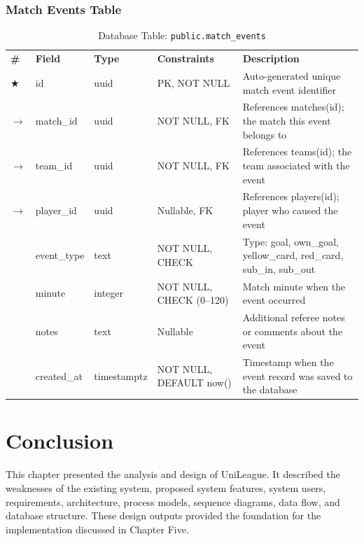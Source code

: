 \documentclass[12pt,a4paper]{report}
\begin{document}
\subsubsection{Match Events Table}
\begin{table}[H]
\centering
\caption{Database Table: \texttt{public.match\_events}}
\setlength{\tabcolsep}{4pt}
\begin{tabular}{p{0.4cm}p{3.5cm}p{2.3cm}p{3.0cm}p{4.5cm}}
\rowcolor[HTML]{003087}
{\color{white}\textbf{\#}} &
{\color{white}\textbf{Field}} &
{\color{white}\textbf{Type}} &
{\color{white}\textbf{Constraints}} &
{\color{white}\textbf{Description}} \\
\rowcolor[HTML]{EEF2FF}
$\bigstar$ & id & uuid & PK, NOT NULL & Auto-generated unique match event identifier \\
\rowcolor[HTML]{FFFFFF}
$\to$ & match\_id & uuid & NOT NULL, FK & References matches(id); the match this event belongs to \\
\rowcolor[HTML]{EEF2FF}
$\to$ & team\_id & uuid & NOT NULL, FK & References teams(id); the team associated with the event \\
\rowcolor[HTML]{FFFFFF}
$\to$ & player\_id & uuid & Nullable, FK & References players(id); player who caused the event \\
\rowcolor[HTML]{EEF2FF}
 & event\_type & text & NOT NULL, CHECK & Type: goal, own\_goal, yellow\_card, red\_card, sub\_in, sub\_out \\
\rowcolor[HTML]{FFFFFF}
 & minute & integer & NOT NULL, CHECK (0--120) & Match minute when the event occurred \\
\rowcolor[HTML]{EEF2FF}
 & notes & text & Nullable & Additional referee notes or comments about the event \\
\rowcolor[HTML]{FFFFFF}
 & created\_at & timestamptz & NOT NULL, DEFAULT now() & Timestamp when the event record was saved to the database \\
\end{tabular}
\end{table}

\section{Conclusion}
This chapter presented the analysis and design of UniLeague. It described the weaknesses of
the existing system, proposed system features, system users, requirements, architecture,
process models, sequence diagrams, data flow, and database structure. These design outputs
provided the foundation for the implementation discussed in Chapter Five.
\end{document}
